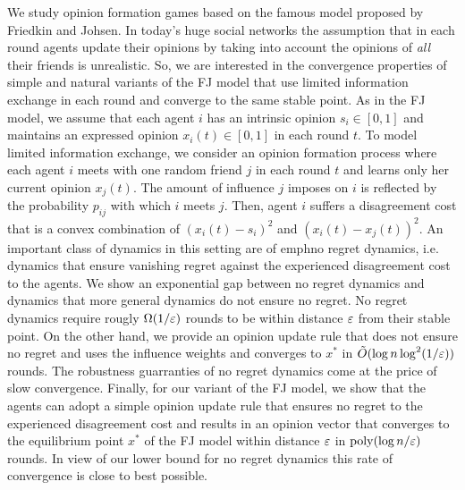 We study opinion formation games based on the famous model proposed by Friedkin
and Johsen. In today's huge social networks the assumption that in each round
agents update their opinions by taking into account the opinions of \emph{all}
their friends is unrealistic. So, we are interested in the convergence
properties of simple and natural variants of the FJ model that use limited
information exchange in each round and converge to the same stable point.
%
As in the FJ model, we assume that each agent $i$ has an intrinsic opinion $s_i
\in [0,1]$ and maintains an expressed opinion $x_i(t) \in [0,1]$ in each round
$t$. To model limited information exchange, we consider an opinion formation
process where each agent $i$ meets with  one random friend $j$ in each round
$t$ and learns only her current opinion $x_j(t)$. The amount of influence $j$
imposes on $i$ is reflected by the probability $p_{ij}$ with which $i$ meets
$j$. Then, agent $i$ suffers a disagreement cost that is a convex combination
of $(x_i(t) - s_i)^2$ and $(x_i(t) - x_j(t))^2$.
%
An important class of dynamics in this setting are of emph{no regret} dynamics,
i.e. dynamics that ensure vanishing regret against the experienced
disagreement cost to the agents.  We show an exponential gap between no regret
dynamics and dynamics that more general dynamics do not ensure no regret.
No regret dynamics require rougly $\Omega(1/\varepsilon)$ rounds to be within
distance $\varepsilon$ from their stable point.  On the other hand, we provide
an opinion update rule that does not ensure no regret and uses the influence weights
and converges to $x^\ast$ in $\tilde{O}(\log n \log^2(1/\varepsilon))$ rounds.
The robustness guarranties of no regret dynamics come at the price
of slow convergence.
Finally, for our variant of the FJ model, we show that the agents can adopt a simple
opinion update rule that ensures no regret to the experienced disagreement cost
and results in an opinion vector that converges to the equilibrium point
$x^\ast$ of the FJ model within distance $\varepsilon$ in $\mathrm{poly}(\log n /\varepsilon)$
rounds. In view of our lower bound for no regret dynamics this rate of
convergence is close to best possible.

